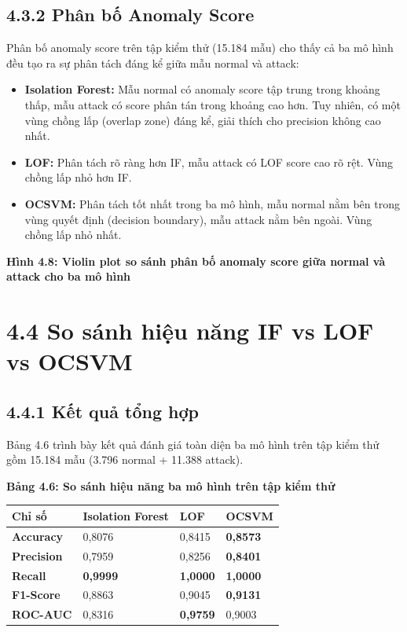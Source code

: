 \documentclass[
  a4paper]{report}
\newcounter{none} %
\providecommand{\tightlist}{%
  \setlength{\itemsep}{0pt}\setlength{\parskip}{0pt}}
\begin{document}
\subsection{4.3.2 Phân bố Anomaly
Score}\label{phuxe2n-bux1ed1-anomaly-score}

Phân bố anomaly score trên tập kiểm thử (15.184 mẫu) cho thấy cả ba mô
hình đều tạo ra sự phân tách đáng kể giữa mẫu normal và attack:

\begin{itemize}
\tightlist
\item
  \textbf{Isolation Forest:} Mẫu normal có anomaly score tập trung trong
  khoảng thấp, mẫu attack có score phân tán trong khoảng cao hơn. Tuy
  nhiên, có một vùng chồng lấp (overlap zone) đáng kể, giải thích cho
  precision không cao nhất.
\item
  \textbf{LOF:} Phân tách rõ ràng hơn IF, mẫu attack có LOF score cao rõ
  rệt. Vùng chồng lấp nhỏ hơn IF.
\item
  \textbf{OCSVM:} Phân tách tốt nhất trong ba mô hình, mẫu normal nằm
  bên trong vùng quyết định (decision boundary), mẫu attack nằm bên
  ngoài. Vùng chồng lấp nhỏ nhất.
\end{itemize}

\textbf{Hình 4.8: Violin plot so sánh phân bố anomaly score giữa normal
và attack cho ba mô hình}

\section{4.4 So sánh hiệu năng IF vs LOF vs
OCSVM}\label{so-suxe1nh-hiux1ec7u-nux103ng-if-vs-lof-vs-ocsvm}

\subsection{4.4.1 Kết quả tổng
hợp}\label{kux1ebft-quux1ea3-tux1ed5ng-hux1ee3p}

Bảng 4.6 trình bày kết quả đánh giá toàn diện ba mô hình trên tập kiểm
thử gồm 15.184 mẫu (3.796 normal + 11.388 attack).

\textbf{Bảng 4.6: So sánh hiệu năng ba mô hình trên tập kiểm thử}

{\def\LTcaptype{none} %
\begin{longtable}[]{@{}llll@{}}
\toprule\noalign{}
Chỉ số & Isolation Forest & LOF & OCSVM \\
\midrule\noalign{}
\endhead
\bottomrule\noalign{}
\endlastfoot
\textbf{Accuracy} & 0,8076 & 0,8415 & \textbf{0,8573} \\
\textbf{Precision} & 0,7959 & 0,8256 & \textbf{0,8401} \\
\textbf{Recall} & \textbf{0,9999} & \textbf{1,0000} & \textbf{1,0000} \\
\textbf{F1-Score} & 0,8863 & 0,9045 & \textbf{0,9131} \\
\textbf{ROC-AUC} & 0,8316 & \textbf{0,9759} & 0,9003 \\
\end{longtable}
}
\end{document}
